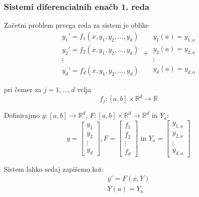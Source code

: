 \documentclass[a4paper,12pt]{article}
\theoremstyle{definition}
\theoremstyle{remark}
\newcommand{\R}{\mathbb{R}}
\begin{document}
\subsubsection{Sistemi diferencialnih enačb 1. reda}
Začetni problem prvega reda za sistem je oblike
\begin{equation*}
    \begin{matrix}
        y_1' = f_1(x, y_1, y_2, \dots, y_d) \\
        y_2' = f_2(x, y_1, y_2, \dots, y_d) \\
        \vdots \\
        y_d' = f_d(x, y_1, y_2, \dots, y_d)
    \end{matrix}
    +
    \begin{matrix}
        y_1(a) = y_{1, a} \\
        y_2(a) = y_{2, a} \\
        \vdots \\
        y_d(a) = y_{d, a}
    \end{matrix}
\end{equation*}

pri čemer za $j = 1, \dots, d$ velja
\begin{equation*}
    f_j: [a, b] \times \R^d \to \R
\end{equation*}

Definirajmo $y: [a, b] \to \R^d$, $F: [a, b]\times \R^d \to \R^d$ in $Y_a$:
\begin{equation*}
    y = \begin{bmatrix}
        y_1 \\
        y_2 \\
        \vdots \\
        y_d
    \end{bmatrix}, 
    F = \begin{bmatrix}
        f_1 \\
        f_2 \\
        \vdots \\
        f_d
    \end{bmatrix} \text{ in } 
    Y_a = \begin{bmatrix}
        y_{1, a} \\
        y_{2, a} \\
        \vdots \\
        y_{d, a}
    \end{bmatrix}  
\end{equation*}

Sistem lahko sedaj zapišemo kot:
\begin{gather*}
    y' = F(x, Y) \\
    Y(a) = Y_a    
\end{gather*}
\end{document}
